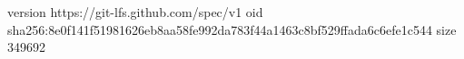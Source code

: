 version https://git-lfs.github.com/spec/v1
oid sha256:8e0f141f51981626eb8aa58fe992da783f44a1463c8bf529ffada6c6efe1c544
size 349692
